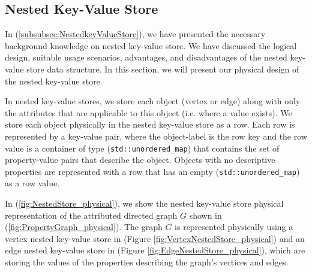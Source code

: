 {\subsection{Nested Key-Value Store}
\label{subsec:PhyDesign-NestedStore}

In (\ref{subsubsec:NestedkeyValueStore}), we have presented the necessary background knowledge on nested key-value store. We have discussed the logical design, suitable usage scenarios, advantages, and disadvantages of the nested key-value store data structure. In this section, we will present our physical design of the nested key-value store.

In nested key-value stores, we store each object (vertex or edge) along with only the attributes that are applicable to this object (i.e. where a value exists). We store each object physically in the nested key-value store as a row. Each row is represented by a key-value pair, where the object-label is the row key and the row value is a container of type (\texttt{std::unordered\_map}) that contains the set of property-value pairs that describe the object. Objects with no descriptive properties are represented with a row that has an empty (\texttt{std::unordered\_map}) as a row value.

In (\ref{fig:NestedStore_physical}), we show the nested key-value store physical representation of the attributed directed graph $G$ shown in (\ref{fig:PropertyGraph_physical}). The graph $G$ is represented physically using a vertex nested key-value store in (Figure \ref{fig:VertexNestedStore_physical}) and an edge nested key-value store in (Figure \ref{fig:EdgeNestedStore_physical}), which are storing the values of the properties describing the graph's vertices and edges.

}
